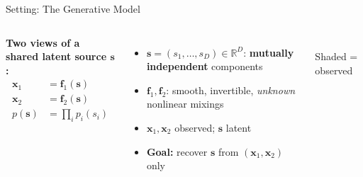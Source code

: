 \documentclass[aspectratio=169, 10pt]{beamer}
\begin{document}
\begin{frame}{Setting: The Generative Model}
  \begin{columns}[T]
      \textbf{Two views of a shared latent source $\mathbf{s}$:}
      \begin{align*}
        \mathbf{x}_1 &= \mathbf{f}_1(\mathbf{s})\\
        \mathbf{x}_2 &= \mathbf{f}_2(\mathbf{s})\\
        p(\mathbf{s}) &= \prod_i p_i(s_i)
      \end{align*}
      \begin{itemize}
        \item $\mathbf{s}=(s_1,\ldots,s_D)\in\mathbb{R}^D$: \textbf{mutually independent} components
        \item $\mathbf{f}_1,\mathbf{f}_2$: smooth, invertible, \emph{unknown} nonlinear mixings
        \item $\mathbf{x}_1,\mathbf{x}_2$ observed; $\mathbf{s}$ latent
        \item \textbf{Goal:} recover $\mathbf{s}$ from $(\mathbf{x}_1,\mathbf{x}_2)$ only
      \end{itemize}
      \medskip

      \centering\vspace{1em}
      \\[0.6em]
      \small Shaded = observed
  \end{columns}
\end{frame}
\end{document}
